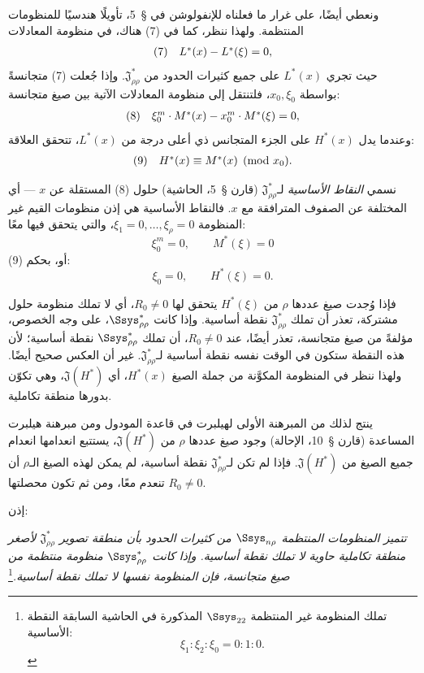\documentclass[11pt]{article}
\newcommand{\srcLTR}[1]{\relax\ifmmode\text{\mbox{\babelsublr{\foreignlanguage{english}{#1}}}}\else\babelsublr{\foreignlanguage{english}{#1}}\fi}
\newcommand{\srcfn}[2]{\begingroup\renewcommand{\thefootnote}{\srcLTR{#1}}\footnote{#2}\addtocounter{footnote}{-1}\endgroup}
\providecommand{\Jdom}{\mathfrak{J}}
\begin{document}
ونعطي أيضًا، على غرار ما فعلناه للإنفولوشن في \S\ 5، تأويلًا هندسيًا للمنظومات المنتظمة. ولهذا ننظر، كما في (7) هناك، في منظومة المعادلات
\[
\begin{array}{@{}l@{\quad}c@{}}
(7)& L^*(x)-L^*(\xi)=0,
\end{array}
\]
حيث تجري $L^*(x)$ على جميع كثيرات الحدود من $\Jdom^*_{\rho\rho}$. وإذا جُعلت (7) متجانسةً بواسطة $x_0,\xi_0$، فلتنتقل إلى منظومة المعادلات الآتية بين صيغ متجانسة:
\[
\begin{array}{@{}l@{\quad}c@{}}
(8)& \xi_0^m\cdot M^*(x)-x_0^m\cdot M^*(\xi)=0,
\end{array}
\]
وعندما يدل $H^*(x)$ على الجزء المتجانس ذي أعلى درجة من $L^*(x)$، تتحقق العلاقة:
\[
\begin{array}{@{}l@{\quad}c@{}}
(9)& H^*(x)\equiv M^*(x)\pmod{x_0}.
\end{array}
\]

نسمي \emph{النقاط الأساسية} لـ$\Jdom^*_{\rho\rho}$ (قارن \S\ 5، الحاشية) حلول (8) المستقلة عن $x$ --- أي المختلفة عن الصفوف المترافقة مع $x$. فالنقاط الأساسية هي إذن منظومات القيم غير المنظومة $\xi_1=0,\ldots,\xi_\rho=0$، والتي يتحقق فيها معًا:
\[
\xi_0^m=0,
\qquad M^*(\xi)=0
\]
أو، بحكم (9):
\[
\xi_0=0,
\qquad H^*(\xi)=0.
\]

فإذا وُجدت صيغ عددها $\rho$ من $H^*(\xi)$ يتحقق لها $R_0\ne0$، أي لا تملك منظومة حلول مشتركة، تعذر أن تملك $\Jdom^*_{\rho\rho}$ نقطة أساسية. وإذا كانت $\Ssys^*_{\rho\rho}$، على وجه الخصوص، مؤلفةً من صيغ متجانسة، تعذر أيضًا، عند $R_0\ne0$، أن تملك $\Ssys^*_{\rho\rho}$ نقطة أساسية؛ لأن هذه النقطة ستكون في الوقت نفسه نقطة أساسية لـ$\Jdom^*_{\rho\rho}$. غير أن العكس صحيح أيضًا. ولهذا ننظر في المنظومة المكوَّنة من جملة الصيغ $H^*(x)$، أي $\Jdom(H^*)$، وهي تكوّن بدورها منطقة تكاملية.

ينتج لذلك من المبرهنة الأولى لهيلبرت في قاعدة المودول ومن مبرهنة هيلبرت المساعدة (قارن \S\ 10، الإحالة) وجود صيغ عددها $\rho$ من $\Jdom(H^*)$، يستتبع انعدامها انعدام جميع الصيغ من $\Jdom(H^*)$. فإذا لم تكن لـ$\Jdom^*_{\rho\rho}$ نقطة أساسية، لم يمكن لهذه الصيغ الـ$\rho$ أن تنعدم معًا، ومن ثم تكون محصلتها $R_0\ne0$.

إذن:

\emph{تتميز المنظومات المنتظمة $\Ssys_{n\rho}$ من كثيرات الحدود بأن منطقة تصوير $\Jdom^*_{\rho\rho}$ لأصغر منطقة تكاملية حاوية لا تملك نقطة أساسية. وإذا كانت $\Ssys^*_{\rho\rho}$ منظومة منتظمة من صيغ متجانسة، فإن المنظومة نفسها لا تملك نقطة أساسية.}\srcfn{*)}{تملك المنظومة غير المنتظمة $\Ssys_{22}$ المذكورة في الحاشية السابقة النقطة الأساسية:
\[
\xi_1:\xi_2:\xi_0=0:1:0.
\]}
\end{document}
